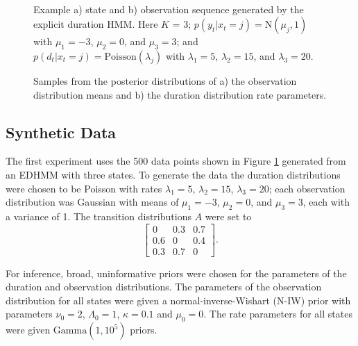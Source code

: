 
\begin{figure}
     \\
    \caption{Example a) state and b) observation sequence generated by the explicit duration HMM. Here $K$ = 3; $p(y_t|x_t=j) = \mathrm{N}(\mu_j, 1)$ with $\mu_1 = -3$, $\mu_2 = 0$, and $\mu_3 = 3$; and $p(d_t|x_t=j) = \mathrm{Poisson}(\lambda_j)$ with $\lambda_1 = 5$, $\lambda_2 = 15$, and $\lambda_3 = 20$.}
    \label{fig:experiment1_data}
\end{figure}

\begin{figure}
    \caption{Samples from the posterior distributions of a) the observation distribution means and b) the duration distribution rate parameters.}
    \label{fig:experiment1_results}
\end{figure}
\subsection{Synthetic Data}

The first experiment uses the 500 data points shown in Figure \ref{fig:experiment1_data} generated from an EDHMM with three states. To generate the data the duration distributions were chosen to be Poisson with rates $\lambda_1 = 5$, $\lambda_2 = 15$, $\lambda_3 = 20$; each observation distribution was Gaussian with means of $\mu_1 = -3$, $\mu_2 = 0$, and $\mu_3 = 3$, each with a variance of 1. The transition distributions $A$ were set to
\begin{equation*}
\begin{bmatrix}
    0 & 0.3 & 0.7 \\ 0.6 & 0 & 0.4 \\ 0.3 & 0.7 & 0
\end{bmatrix}.  
\end{equation*}



For inference, broad, uninformative priors were chosen for the parameters of the duration and observation distributions. The parameters of the observation distribution for all states were given a normal-inverse-Wishart (N-IW) prior with parameters $\nu_0 = 2$, $\Lambda_0 = 1$, $\kappa=0.1$ and $\mu_0 = 0$. The rate parameters for all states were given $\mathrm{Gamma}(1, 10^{5})$ priors. 

